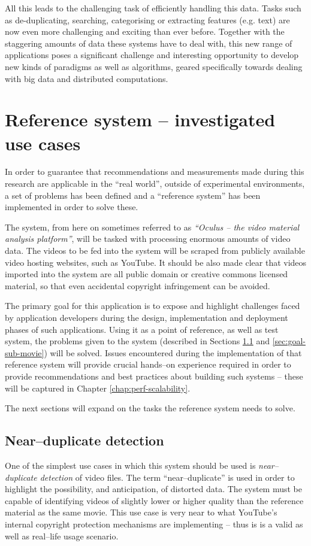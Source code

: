 All this leads to the challenging task of efficiently handling this data. Tasks such as de-duplicating, searching, categorising or extracting features (e.g. text) are now even more challenging and exciting than ever before. Together with the staggering amounts of data these systems have to deal with, this new range of applications poses a significant challenge and interesting opportunity to develop new kinds of paradigms as well as algorithms, geared specifically towards dealing with big data and distributed computations.


\section{Reference system -- investigated use cases}
\label{sec:ref-system}

In order to guarantee that recommendations and measurements made during this research are applicable in the ``real world'', outside of experimental environments, a set of problems has been defined and a ``reference system'' has been implemented in order to solve these.

The system, from here on sometimes referred to as \textit{``Oculus -- the video material analysis platform''}, will be tasked with processing enormous amounts of video data. The videos to be fed into the system will be scraped from publicly available video hosting websites, such as YouTube. It should be also made clear that videos imported into the system are all public domain or creative commons licensed material, so that even accidental copyright infringement can be avoided.

The primary goal for this application is to expose and highlight challenges faced by application developers during the design, implementation and deployment phases of such applications. Using it as a point of reference, as well as test system, the problems given to the system (described in Sections \ref{sec:goal-near-dup} and \ref{sec:goal-sub-movie}) will be solved. Issues encountered during the implementation of that reference system will provide crucial hands--on experience required in order to provide recommendations and best practices about building such systems -- these will be captured in Chapter \ref{chap:perf-scalability}.

The next sections will expand on the tasks the reference system needs to solve.


\subsection{Near--duplicate detection}
\label{sec:goal-near-dup}
One of the simplest use cases in which this system should be used is \textit{near--duplicate detection} of video files. The term ``near--duplicate'' is used in order to highlight the possibility, and anticipation, of distorted data. The system must be capable of identifying videos of slightly lower or higher quality than the reference material as the same movie. This use case is very near to what YouTube's \cite{youtube} internal copyright protection mechanisms are implementing -- thus is is a valid as well as real--life usage scenario.

